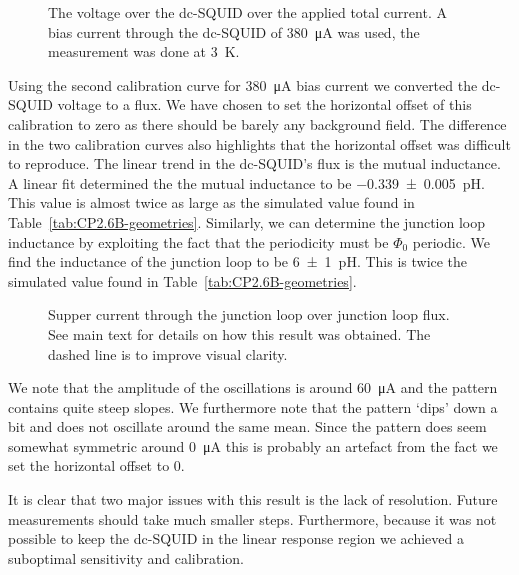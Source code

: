 \begin{figure}[ht!]
	\centering
	
	\caption{The voltage over the dc-SQUID over the applied total current. A bias current through the dc-SQUID of \qty{380}{\micro\ampere} was used, the measurement was done at \qty{3}{\kelvin}.}
	\label{fig:CP2.6B_SQUID_voltage_over_total_current}
\end{figure}

Using the second calibration curve for \qty{380}{\micro\ampere} bias current we converted the dc-SQUID voltage to a flux. We have chosen to set the horizontal offset of this calibration to zero as there should be barely any background field. The difference in the two calibration curves also highlights that the horizontal offset was difficult to reproduce. The linear trend in the dc-SQUID's flux is the mutual inductance. A linear fit determined the the mutual inductance to be \qty{-0.339\pm0.005}{\pico\henry}. This value is almost twice as large as the simulated value found in Table~\ref{tab:CP2.6B-geometries}. Similarly, we can determine the junction loop inductance by exploiting the fact that the periodicity must be $\Phi_0$ periodic. We find the inductance of the junction loop to be \qty{6\pm1}{\pico\henry}. This is twice the simulated value found in Table~\ref{tab:CP2.6B-geometries}.

\begin{figure}[ht!]
	\centering
	
	\caption{Supper current through the junction loop over junction loop flux. See main text for details on how this result was obtained. The dashed line is to improve visual clarity.}
	\label{fig:CP2.6B_super_current_over_loop_flux}
\end{figure}

We note that the amplitude of the oscillations is around \qty{60}{\micro\ampere} and the pattern contains quite steep slopes. We furthermore note that the pattern `dips' down a bit and does not oscillate around the same mean. Since the pattern does seem somewhat symmetric around \qty{0}{\micro\ampere} this is probably an artefact from the fact we set the horizontal offset to 0.

It is clear that two major issues with this result is the lack of resolution. Future measurements should take much smaller steps. Furthermore, because it was not possible to keep the dc-SQUID in the linear response region we achieved a suboptimal sensitivity and calibration.